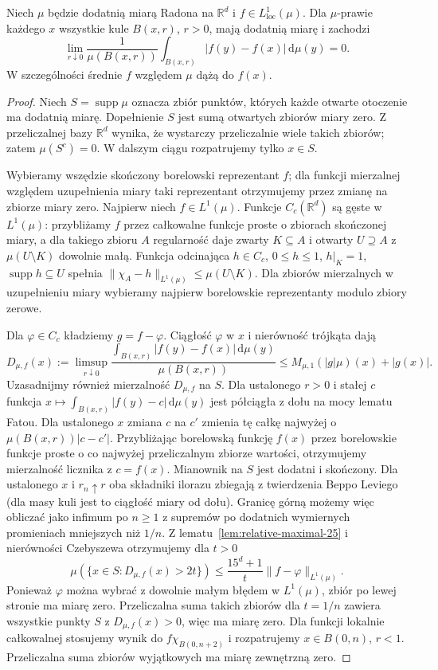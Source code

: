 \begin{twierdzenie}
\label{thm:relative-lebesgue-25}
Niech $\mu$ będzie dodatnią miarą Radona na $\mathbb R^d$
i $f\in L^1_{\mathrm{loc}}(\mu)$. Dla $\mu$-prawie każdego
$x$ wszystkie kule $B(x,r)$, $r>0$, mają dodatnią miarę
i zachodzi
\[
 \lim_{r\downarrow0}
 \frac{1}{\mu(B(x,r))}
 \int_{B(x,r)}|f(y)-f(x)|\,\mathrm d\mu(y)=0.
\]
W szczególności średnie $f$ względem $\mu$ dążą do $f(x)$.
\end{twierdzenie}
\begin{proof}
Niech $S=\operatorname{supp}\mu$ oznacza zbiór punktów,
których każde otwarte otoczenie ma dodatnią miarę.
Dopełnienie $S$ jest sumą otwartych zbiorów miary zero.
Z przeliczalnej bazy $\mathbb R^d$ wynika, że wystarczy
przeliczalnie wiele takich zbiorów; zatem $\mu(S^c)=0$.
W dalszym ciągu rozpatrujemy tylko $x\in S$.

Wybieramy wszędzie skończony borelowski reprezentant $f$;
dla funkcji mierzalnej względem uzupełnienia miary taki
reprezentant otrzymujemy przez zmianę na zbiorze miary zero.
Najpierw niech $f\in L^1(\mu)$. Funkcje $C_c(\mathbb R^d)$
są gęste w $L^1(\mu)$: przybliżamy $f$ przez całkowalne
funkcje proste o zbiorach skończonej miary, a dla takiego
zbioru $A$ regularność daje zwarty $K\subseteq A$
i otwarty $U\supseteq A$ z $\mu(U\setminus K)$ dowolnie małą.
Funkcja odcinająca $h\in C_c$, $0\le h\le1$,
$h|_K=1$, $\operatorname{supp}h\subseteq U$ spełnia
$\|\chi_A-h\|_{L^1(\mu)}\le\mu(U\setminus K)$.
Dla zbiorów mierzalnych w uzupełnieniu miary wybieramy
najpierw borelowskie reprezentanty modulo zbiory zerowe.

Dla $\varphi\in C_c$ kładziemy $g=f-\varphi$.
Ciągłość $\varphi$ w $x$ i nierówność trójkąta dają
\[
 D_{\mu,f}(x):=\limsup_{r\downarrow0}
 \frac{\int_{B(x,r)}|f(y)-f(x)|\,\mathrm d\mu(y)}
 {\mu(B(x,r))}
 \le M_{\mu,1}(|g|\mu)(x)+|g(x)|.
\]
Uzasadnijmy również mierzalność $D_{\mu,f}$ na $S$.
Dla ustalonego $r>0$ i stałej $c$ funkcja
$x\mapsto\int_{B(x,r)}|f(y)-c|\,\mathrm d\mu(y)$
jest półciągła z dołu na mocy lematu Fatou.
Dla ustalonego $x$ zmiana $c$ na $c'$ zmienia tę
całkę najwyżej o $\mu(B(x,r))|c-c'|$.
Przybliżając borelowską funkcję $f(x)$ przez borelowskie
funkcje proste o co najwyżej przeliczalnym zbiorze
wartości, otrzymujemy mierzalność licznika z $c=f(x)$.
Mianownik na $S$ jest dodatni i skończony.
Dla ustalonego $x$ i $r_n\uparrow r$ oba składniki
ilorazu zbiegają z twierdzenia Beppo Leviego (dla masy
kuli jest to ciągłość miary od dołu). Granicę górną
możemy więc obliczać jako infimum po $n\ge1$ z supremów
po dodatnich wymiernych promieniach mniejszych niż $1/n$.
Z lematu~\ref{lem:relative-maximal-25}
i nierówności Czebyszewa otrzymujemy dla $t>0$
\[
 \mu(\{x\in S:D_{\mu,f}(x)>2t\})
 \le\frac{15^d+1}{t}\|f-\varphi\|_{L^1(\mu)}.
\]
Ponieważ $\varphi$ można wybrać z dowolnie małym
błędem w $L^1(\mu)$, zbiór po lewej stronie ma miarę zero.
Przeliczalna suma takich zbiorów dla $t=1/n$ zawiera
wszystkie punkty $S$ z $D_{\mu,f}(x)>0$, więc ma miarę zero.
Dla funkcji lokalnie całkowalnej stosujemy wynik do
$f\chi_{B(0,n+2)}$ i rozpatrujemy $x\in B(0,n)$,
$r<1$. Przeliczalna suma zbiorów wyjątkowych ma
miarę zewnętrzną zero.
\end{proof}

